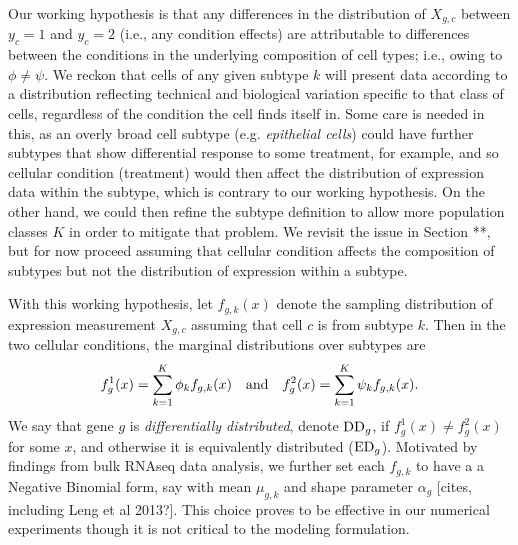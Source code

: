 \documentclass[11pt]{amsart}
\begin{document}
Our working hypothesis is that any differences in the distribution of $X_{g,c}$ 
between $y_c=1$ and $y_c=2$ (i.e., any condition effects) are attributable 
to differences between the conditions 
in the underlying composition of cell types; i.e.,
owing to $\phi \neq \psi$.  We reckon that cells of any given subtype $k$ will
present data according to a distribution reflecting technical 
and biological variation specific to that class of cells, regardless of the 
condition the cell finds itself in.   Some care is needed in this, as an overly
broad cell subtype (e.g. {\em epithelial cells}) could have
further subtypes that show differential response to some treatment, for example,
and so cellular condition (treatment) would then affect the distribution of 
expression data within the subtype, which is contrary to our working hypothesis.
On the other hand, we could then refine the subtype definition to allow more
population classes $K$ in order to mitigate that problem.
We revisit the issue in Section **, but for now proceed assuming that cellular 
condition affects the composition of subtypes but not the distribution of expression
within a subtype.

With this working hypothesis, let $f_{g,k}(x)$ denote the sampling distribution
of expression measurement $X_{g,c}$ assuming that cell $c$ is from subtype $k$.
Then in the two cellular conditions, the marginal distributions over subtypes are
\begin{eqnarray*}
f_g^1(x) = \sum_{k=1}^K \phi_k f_{g,k} (x) \quad {\mbox {\rm and}} \quad
f_g^2(x) = \sum_{k=1}^K \psi_k f_{g,k} (x).
\end{eqnarray*}
We say that gene $g$ is {\em differentially distributed}, denote ${\rm DD}_g$,
if $f_g^1(x) \neq f_g^2(x)$ for some $x$, and otherwise it is equivalently distributed
(${\rm ED}_g$). Motivated by findings from bulk RNAseq data analysis, we further
set each $f_{g,k}$ to have a a Negative Binomial form, say with mean $\mu_{g,k}$
and shape parameter $\alpha_g$ [cites, including Leng et al 2013?]. This choice
proves to be effective in our numerical experiments though it is not critical to
the modeling formulation.
\end{document}
